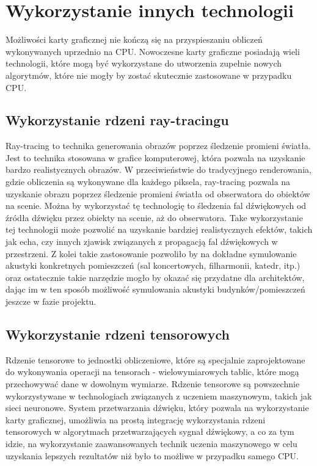 \section{Wykorzystanie innych technologii}
Możliwości karty graficznej nie kończą się na przyspieszaniu obliczeń wykonywanych uprzednio na CPU. Nowoczesne karty graficzne posiadają wieli technologii, które mogą być wykorzystane do utworzenia zupełnie nowych algorytmów, które nie mogły by zostać skutecznie zastosowane w przypadku CPU.

\subsection{Wykorzystanie rdzeni ray-tracingu}
Ray-tracing to technika generowania obrazów poprzez śledzenie promieni światła. Jest to technika stosowana w grafice komputerowej, która pozwala na uzyskanie bardzo realistycznych obrazów. W przeciwieństwie do tradycyjnego renderowania, gdzie obliczenia są wykonywane dla każdego piksela, ray-tracing pozwala na uzyskanie obrazu poprzez śledzenie promieni światła od obserwatora do obiektów na scenie. Można by wykorzystać tę technologię to śledzenia fal dźwiękowych od źródła dźwięku przez obiekty na scenie, aż do obserwatora. Take wykorzystanie tej technologii może pozwolić na uzyskanie bardziej realistycznych efektów, takich jak echa, czy innych zjawisk związanych z propagacją fal dźwiękowych w przestrzeni. Z kolei takie zastosowanie pozwoliło by na dokładne symulowanie akustyki konkretnych pomieszczeń (sal koncertowych, filharmonii, katedr, itp.) oraz ostatecznie takie narzędzie mogło by okazać się przydatne dla architektów, dając im w ten sposób możliwość symulowania akustyki budynków/pomieszczeń jeszcze w fazie projektu.

\subsection{Wykorzystanie rdzeni tensorowych}
Rdzenie tensorowe to jednostki obliczeniowe, które są specjalnie zaprojektowane do wykonywania operacji na tensorach - wielowymiarowych tablic, które mogą przechowywać dane w dowolnym wymiarze. Rdzenie tensorowe są powszechnie wykorzystywane w technologiach związanych z uczeniem maszynowym, takich jak sieci neuronowe. System przetwarzania dźwięku, który pozwala na wykorzystanie karty graficznej, umożliwia na prostą integrację wykorzystania rdzeni tensorowych w algorytmach przetwarzających sygnał dźwiękowy, a co za tym idzie, na wykorzystanie zaawansowanych technik uczenia maszynowego w celu uzyskania lepszych rezultatów niż było to możliwe w przypadku samego CPU.

